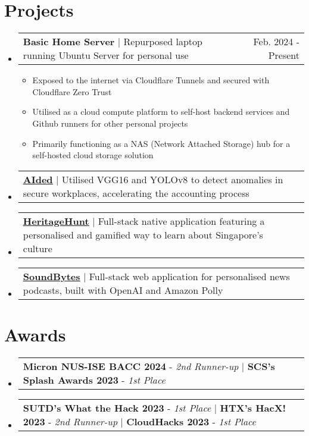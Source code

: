 \documentclass[letterpaper,11pt]{article}
\makeatletter
\newcommand{\resumeItem}[1]{
  \item\small{
    {#1 \vspace{-2pt}}
  }
}
\newcommand{\resumeProjectHeading}[2]{
    \item
    \begin{tabular*}{0.97\textwidth}{l@{\extracolsep{\fill}}r}
      \small#1 & #2 \\
    \end{tabular*}\vspace{-7pt}
}
\newcommand{\resumeSubHeadingListStart}{\begin{itemize}[leftmargin=0.15in, label={}]}
\newcommand{\resumeSubHeadingListEnd}{\end{itemize}}
\newcommand{\resumeItemListStart}{\begin{itemize}}
\newcommand{\resumeItemListEnd}{\end{itemize}\vspace{-5pt}}
\makeatother
\begin{document}
\section{Projects}
  \resumeSubHeadingListStart
    \resumeProjectHeading
      {\textbf{Basic Home Server}  $|$ Repurposed laptop running Ubuntu Server for personal use}{Feb. 2024 - Present}
      \resumeItemListStart
        \resumeItem{Exposed to the internet via Cloudflare Tunnels and secured with Cloudflare Zero Trust}
        \resumeItem{Utilised as a cloud compute platform to self-host backend services and Github runners for other personal projects}
        \resumeItem{Primarily functioning as a NAS (Network Attached Storage) hub for a self-hosted cloud storage solution}
      \resumeItemListEnd
    \resumeProjectHeading
      {\textbf{\href{https://github.com/duckyfuz/accountingReID-hacX2023}{\underline{AIded}}} $|$ Utilised VGG16 and YOLOv8 to detect anomalies in secure workplaces, accelerating the accounting process}{}
    \resumeProjectHeading
      {\textbf{\href{https://github.com/duckyfuz/heritageHunt-SplashAwards2023}{\underline{HeritageHunt}}} $|$ Full-stack native application featuring a personalised and gamified way to learn about Singapore’s culture}{}
    \resumeProjectHeading
      {\textbf{\href{https://github.com/duckyfuz/soundBytes-cloudHacks2023}{\underline{SoundBytes}}} $|$ Full-stack web application for personalised news podcasts, built with OpenAI and Amazon Polly}{}
  \resumeSubHeadingListEnd

\section{Awards}
  \resumeSubHeadingListStart
    \resumeProjectHeading
    {\textbf{Micron NUS-ISE BACC 2024} - \emph{2nd Runner-up} $|$ \textbf{SCS’s Splash Awards 2023} - \emph{1st Place}}{}
    \resumeProjectHeading
        {\textbf{SUTD's What the Hack 2023} - \emph{1st Place} $|$ \textbf{HTX's HacX! 2023} - \emph{2nd Runner-up} $|$ \textbf{CloudHacks 2023} - \emph{1st Place}}{}
  \resumeSubHeadingListEnd
\end{document}

